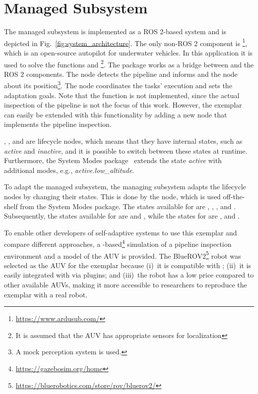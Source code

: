 \section{Managed Subsystem}\label{sec:managed}

The managed subsystem is implemented as a ROS 2-based system and is depicted in Fig.~\ref{fig:system_architecture}. The only non-ROS 2 component is \footnote{\url{https://www.ardusub.com/}}, which is an open-source autopilot for underwater vehicles. In this application it is used to solve the functions  and \footnote{It is assumed that the AUV has appropriate sensors for localization}. The 
package works as a bridge between  and the ROS 2 components. The  node detects the pipeline and informs  and the  node about its position\footnote{A mock perception system is used.}. The  node coordinates the tasks' execution and sets the adaptation goals. Note that the function  is not implemented,
since the actual inspection of the pipeline is not the focus of this work. However, the exemplar can easily be extended with this functionality by adding a new node that implements the pipeline inspection.

, ,  and  are lifecycle nodes, which means that they have internal states, such as \emph{active} and \emph{inactive}, and it is possible to switch between these states at runtime. Furthermore, the System Modes package~\cite{nordmannSystemModes2021}
extends the state \emph{active} with additional modes, e.g., \emph{active.low\_altitude}.

To adapt the managed subsystem, the managing subsystem adapts the lifecycle nodes by changing their states. This is done by the  node, which is used off-the-shelf from the System Modes package.
The states available for  are , , , and . Subsequently, the states available for  are  and , while the states for  are , and .

To enable other developers of self-adaptive systems to use this exemplar and compare different approaches, a -based\footnote{\url{https://gazebosim.org/home}} simulation of a pipeline inspection environment and a model of the AUV is provided. The BlueROV2\footnote{\url{https://bluerobotics.com/store/rov/bluerov2/}}
robot was selected as the AUV for the exemplar because (i)~it is compatible with ; (ii)~it is easily integrated with  via plugins; and (iii)~the robot has a low price compared to other available AUVs, making it more accessible to researchers to reproduce the exemplar with a real robot.

